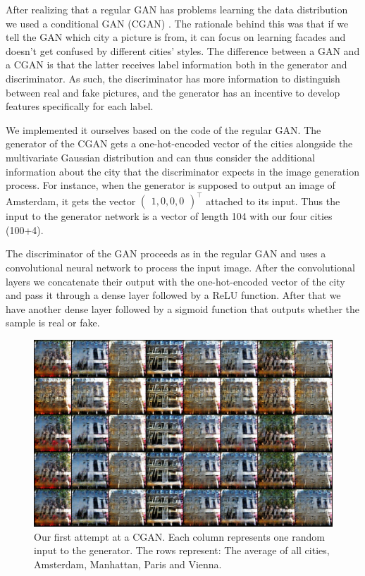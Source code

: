 \documentclass[a4paper]{article}
\begin{document}
After realizing that a regular GAN has problems learning the data distribution we used a conditional GAN (CGAN) \citep{mirza_conditional_2014}. The rationale behind this was that if we tell the GAN which city a picture is from, it can focus on learning facades and doesn't get confused by different cities' styles. 
The difference between a GAN and a CGAN is that the latter receives label information both in the generator and discriminator.
As such, the discriminator has more information to distinguish between real and fake pictures, and the generator has an incentive to develop features specifically for each label.

We implemented it ourselves based on the code of the regular GAN. The generator of the CGAN gets a one-hot-encoded vector of the cities alongside the multivariate Gaussian distribution and can thus consider the additional information about the city that the discriminator expects in the image generation process. For instance, when the generator is supposed to output an image of Amsterdam, it gets the vector $\begin{pmatrix}1, 0, 0, 0 \end{pmatrix}^\top$ attached to its input. Thus the input to the generator network is a vector of length 104 with our four cities (100+4). 

The discriminator of the GAN proceeds as in the regular GAN and uses a convolutional neural network to process the input image. After the convolutional layers we concatenate their output with the one-hot-encoded vector of the city and pass it through a dense layer followed by a ReLU function. After that we have another dense layer followed by a sigmoid function that outputs whether the sample is real or fake.  

\begin{figure}[h]
\includegraphics[width=\columnwidth]{figures/daniel_net.png}
\caption{Our first attempt at a CGAN. Each column represents one random input to the generator. The rows represent: The average of all cities, Amsterdam, Manhattan, Paris and Vienna. }
\label{fig:daniel_net}
\end{figure}
\end{document}
